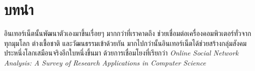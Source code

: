\section{บทนำ}
อินเทอร์เน็ตนั้นพัฒนาตัวเองมาขึ้นเรื่อยๆ มากกว่าที่เราคาดถึง ช่วยเชื่อมต่อเครื่องคอมพิวเตอร์ทั่วจากทุกมุมโลก ต่างเชื้อชาติ และวัฒนธรรมเข้าด้วยกัน มากไปกว่านั้นอินเทอร์เน็ตได้ช่วยสร้างกลุ่มสังคมประหนึ่งโลกเสมือนจริงอีกใบหนึ่งขึ้นมา ด้วยการเชื่อมโยงที่เรียกว่า{\OSN} \textit{Online Social Network Analysis: A Survey of Research Applications in Computer Science} \cite{DBLP:journals/corr/KurkaGZ15}